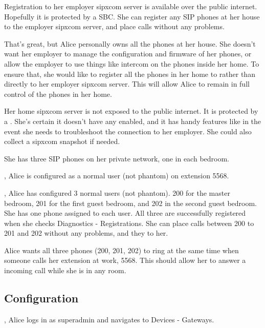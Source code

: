 \documentclass[letterpaper,10pt,english]{sphinxmanual}
\begin{document}
Registration to her employer sipxcom server is available over the public internet. Hopefully it is protected by a SBC.
She can register any SIP phones at her house to the employer sipxcom server, and place calls without any problems.

That’s great, but Alice personally owns all the phones at her house.
She doesn’t want her employer to manage the configuration and firmware of her phones, or allow the employer to use things like intercom on the phones inside her home.
To ensure that, she would like to register all the phones in her home to  rather than directly to her employer sipxcom server.
This will allow Alice to remain in full control of the phones in her home.

Her home sipxcom server is not exposed to the public internet. It is protected by a .
She’s certain it doesn’t have any  enabled, and it has handy features like 
in the event she needs to troubleshoot the connection to her employer. She could also collect a sipxcom snapshot if needed.


She has three SIP phones on her private network, one in each bedroom.

, Alice is configured as a normal user (not phantom) on extension 5568.

, Alice has configured 3 normal users (not phantom). 200 for the master bedroom, 201 for the first guest bedroom, and 202 in the second guest bedroom.
She has one phone assigned to each user. All three are successfully registered when she checks Diagnostics - Registrations.
She can place calls between 200 to 201 and 202 without any problems, and they to her.

Alice wants all three phones (200, 201, 202) to ring at the same time when someone calls her extension at work, 5568.
This should allow her to answer a incoming call while she is in any room.


\subsection{Configuration}
\label{\detokenize{howto:id1}}
, Alice logs in as superadmin and navigates to Devices - Gateways.
\end{document}
